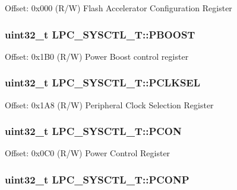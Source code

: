 Offset\-: 0x000 (R/\-W) Flash Accelerator Configuration Register \hypertarget{structLPC__SYSCTL__T_acc912b84bbe8dc170fdf50300d341acb}{
\subsubsection[{P\-B\-O\-O\-S\-T}]{ uint32\-\_\-t L\-P\-C\-\_\-\-S\-Y\-S\-C\-T\-L\-\_\-\-T\-::\-P\-B\-O\-O\-S\-T}}\label{structLPC__SYSCTL__T_acc912b84bbe8dc170fdf50300d341acb}
Offset\-: 0x1\-B0 (R/\-W) Power Boost control register \hypertarget{structLPC__SYSCTL__T_a55111e26d098f9e4ee0dbfd5b243a014}{
\subsubsection[{P\-C\-L\-K\-S\-E\-L}]{ uint32\-\_\-t L\-P\-C\-\_\-\-S\-Y\-S\-C\-T\-L\-\_\-\-T\-::\-P\-C\-L\-K\-S\-E\-L}}\label{structLPC__SYSCTL__T_a55111e26d098f9e4ee0dbfd5b243a014}
Offset\-: 0x1\-A8 (R/\-W) Peripheral Clock Selection Register \hypertarget{structLPC__SYSCTL__T_a92e2ea242fb2d75af44c1979a8cf9ce4}{
\subsubsection[{P\-C\-O\-N}]{ uint32\-\_\-t L\-P\-C\-\_\-\-S\-Y\-S\-C\-T\-L\-\_\-\-T\-::\-P\-C\-O\-N}}\label{structLPC__SYSCTL__T_a92e2ea242fb2d75af44c1979a8cf9ce4}
Offset\-: 0x0\-C0 (R/\-W) Power Control Register \hypertarget{structLPC__SYSCTL__T_a27650e24e19bd3b8db140db39d9ab1c4}{
\subsubsection[{P\-C\-O\-N\-P}]{ uint32\-\_\-t L\-P\-C\-\_\-\-S\-Y\-S\-C\-T\-L\-\_\-\-T\-::\-P\-C\-O\-N\-P}}\label{structLPC__SYSCTL__T_a27650e24e19bd3b8db140db39d9ab1c4}
